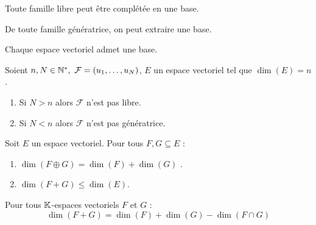 \begin{theorem}
	Toute famille libre peut être complétée en une base.
\end{theorem}

\begin{theorem}
    De toute famille génératrice, on peut extraire une base.
\end{theorem}

\begin{theorem}
    Chaque espace vectoriel admet une base.
\end{theorem}

\begin{corollary}
	Soient $n, N \in \mathbb{N}^*,\ \mathcal{F} = (u_1, \ldots, u_N)$, $E$ un espace vectoriel tel que $\dim(E) = n$.
	\begin{enumerate}
		\item Si $N > n$ alors $\mathcal{F}$ n'est pas libre.
		\item Si $N < n$ alors $\mathcal{F}$ n'est pas génératrice.
	\end{enumerate}
\end{corollary}

\begin{proposition}
	Soit $E$ un espace vectoriel. Pour tous $F, G\subseteq E$ :
	\begin{multicols}{2}
	    \begin{enumerate}
    		\item $\dim(F \oplus G) = \dim(F) + \dim(G)$ .
    		\item $\dim(F + G) \leq \dim(E)$.
    	\end{enumerate}
	\end{multicols}
\end{proposition}

\begin{theorem}
	Pour tous $\mathbb{K}$-espaces vectoriels $F$ et $G$ :
	\[ \dim(F+G) = \dim(F) + \dim(G) - \dim(F\cap G) \]
\end{theorem}

